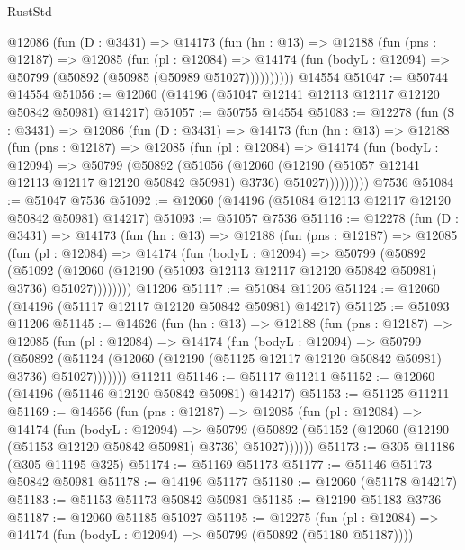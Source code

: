 \begin{lexlean}{RustStd}
\begin{coremodule}
      @12086
        (fun (D : @3431) =>
        @14173
          (fun (hn : @13) =>
          @12188
            (fun (pns : @12187) =>
            @12085
              (fun (pl : @12084) =>
              @14174 (fun (bodyL : @12094) => @50799 (@50892 (@50985 (@50989 @51027))))))))))
    @14554
@51047 := @50744 @14554
@51056 := @12060 (@14196 (@51047 @12141 @12113 @12117 @12120 @50842 @50981) @14217)
@51057 := @50755 @14554
@51083 := @12278
    (fun (S : @3431) =>
    @12086
      (fun (D : @3431) =>
      @14173
        (fun (hn : @13) =>
        @12188
          (fun (pns : @12187) =>
          @12085
            (fun (pl : @12084) =>
            @14174
              (fun (bodyL : @12094) =>
              @50799
                (@50892
                  (@51056
                    (@12060
                      (@12190 (@51057 @12141 @12113 @12117 @12120 @50842 @50981) @3736)
                      @51027)))))))))
    @7536
@51084 := @51047 @7536
@51092 := @12060 (@14196 (@51084 @12113 @12117 @12120 @50842 @50981) @14217)
@51093 := @51057 @7536
@51116 := @12278
    (fun (D : @3431) =>
    @14173
      (fun (hn : @13) =>
      @12188
        (fun (pns : @12187) =>
        @12085
          (fun (pl : @12084) =>
          @14174
            (fun (bodyL : @12094) =>
            @50799
              (@50892
                (@51092
                  (@12060 (@12190 (@51093 @12113 @12117 @12120 @50842 @50981) @3736) @51027))))))))
    @11206
@51117 := @51084 @11206
@51124 := @12060 (@14196 (@51117 @12117 @12120 @50842 @50981) @14217)
@51125 := @51093 @11206
@51145 := @14626
    (fun (hn : @13) =>
    @12188
      (fun (pns : @12187) =>
      @12085
        (fun (pl : @12084) =>
        @14174
          (fun (bodyL : @12094) =>
          @50799
            (@50892
              (@51124 (@12060 (@12190 (@51125 @12117 @12120 @50842 @50981) @3736) @51027)))))))
    @11211
@51146 := @51117 @11211
@51152 := @12060 (@14196 (@51146 @12120 @50842 @50981) @14217)
@51153 := @51125 @11211
@51169 := @14656
    (fun (pns : @12187) =>
    @12085
      (fun (pl : @12084) =>
      @14174
        (fun (bodyL : @12094) =>
        @50799 (@50892 (@51152 (@12060 (@12190 (@51153 @12120 @50842 @50981) @3736) @51027))))))
@51173 := @305 @11186 (@305 @11195 @325)
@51174 := @51169 @51173
@51177 := @51146 @51173 @50842 @50981
@51178 := @14196 @51177
@51180 := @12060 (@51178 @14217)
@51183 := @51153 @51173 @50842 @50981
@51185 := @12190 @51183 @3736
@51187 := @12060 @51185 @51027
@51195 := @12275
    (fun (pl : @12084) => @14174 (fun (bodyL : @12094) => @50799 (@50892 (@51180 @51187))))

\end{coremodule}
\end{lexlean}
